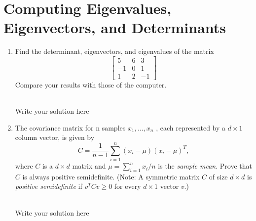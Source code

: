\documentclass[a4paper]{article}
\begin{document}
% 
% 
\clearpage
\section{Computing Eigenvalues, Eigenvectors, and Determinants}

\begin{enumerate}
	\item Find the determinant, eigenvectors, and eigenvalues of the matrix
	      \[
		      \begin{bmatrix}
			      5  & 6 & 3  \\
			      -1 & 0 & 1  \\
			      1  & 2 & -1
		      \end{bmatrix}
	      \]
	      Compare your results with those of the computer.

	      \hrulefill \\
	      Write your solution here


	\item The covariance matrix for n samples $x_1, \dots, x_n$ , each represented by a $d \times 1$ column vector, is given by
	      \[
		      C = \frac{1}{n - 1} \sum^n_{i=1} (x_i - \mu)(x_i - \mu)^T,
	      \]
	      where $C$ is a $d \times d$ matrix and $\mu = \sum^n_{i=1} x_i/n$ is the \textit{sample mean}.
	      Prove that $C$ is always positive semidefinite. (Note: A symmetric matrix $C$ of size $d \times d$ is \textit{positive semidefinite} if $v^T C v \geq 0$ for every $d \times 1$ vector $v$.)

	      \hrulefill \\
	      Write your solution here


\end{enumerate}
\end{document}
